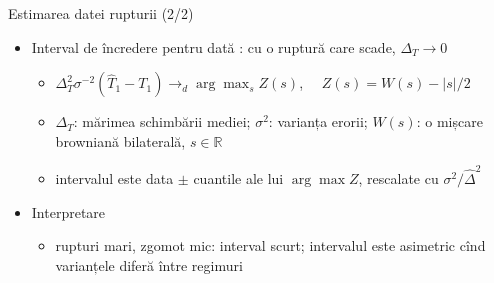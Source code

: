 \begin{frame}{Estimarea datei rupturii (2/2)}
\itemsize{\small}
\begin{itemize}
    \item Interval de încredere pentru dată : cu o ruptură care scade, $\Delta_T \to 0$
    \begin{itemize}
        \item $\Delta_T^2\sigma^{-2}(\hat T_1 - T_1) \to_d \arg\max_s Z(s)$, $\quad Z(s) = W(s) - |s|/2$
        \item $\Delta_T$: mărimea schimbării mediei; $\sigma^2$: varianța erorii; $W(s)$: o mișcare browniană bilaterală, $s \in \mathbb R$
        \item intervalul este data $\pm$ cuantile ale lui $\arg\max Z$, rescalate cu $\sigma^2/\hat\Delta^2$
    \end{itemize}
    \item Interpretare
    \begin{itemize}
        \item rupturi mari, zgomot mic: interval scurt; intervalul este asimetric cînd varianțele diferă între regimuri
    \end{itemize}
\end{itemize}
\end{frame}


